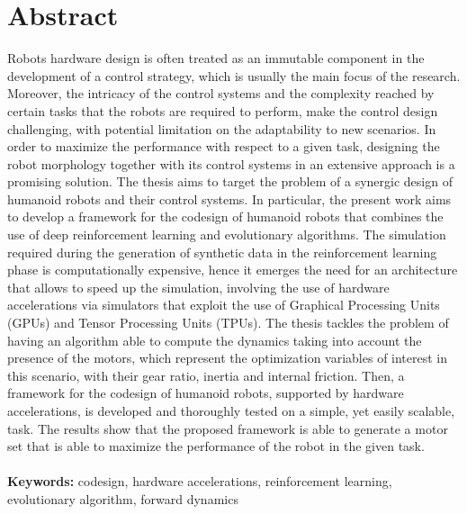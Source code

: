 \documentclass{Configuration_Files/PoliMi3i_thesis}
\begin{document}
\chapter*{Abstract}
Robots hardware design is often treated as an immutable component in the development of a control strategy, which is usually the main focus of the research.
Moreover, the intricacy of the control systems and the complexity reached by certain tasks that the robots are required to perform, make the control design
challenging, with potential limitation on the adaptability to new scenarios. In order to maximize the performance with respect to a given task,
designing the robot morphology together with its control systems in an extensive approach is a promising solution.
The thesis aims to target the problem of a synergic design of humanoid robots and their control systems. In particular, the present work aims
to develop a framework for the codesign of humanoid robots that combines the use of deep reinforcement learning and evolutionary algorithms.
The simulation required during the generation of synthetic data in the reinforcement learning phase is computationally expensive, hence it
emerges the need for an architecture that allows to speed up the simulation, involving the use of hardware accelerations via simulators that exploit the use of Graphical Processing Units (GPUs) and Tensor Processing Units (TPUs). The thesis tackles the
problem of having an algorithm able to compute the dynamics taking into account the presence of the motors, which represent the optimization
variables of interest in this scenario, with their gear ratio, inertia and internal friction. Then, a framework for the codesign of humanoid robots,
supported by hardware accelerations, is developed and thoroughly tested on a simple, yet easily scalable, task. The results show that the proposed
framework is able to generate a motor set that is able to maximize the performance of the robot in the given task.
\\
\\
\textbf{Keywords:} codesign, hardware accelerations, reinforcement learning, evolutionary algorithm, forward dynamics %

\end{document}

